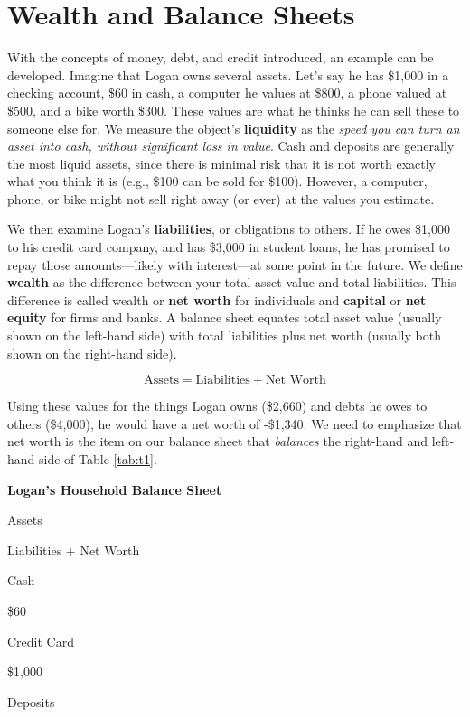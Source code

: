 \documentclass[
]{book}
\begin{document}
\hypertarget{wealth-and-balance-sheets}{%
\section{Wealth and Balance Sheets}\label{wealth-and-balance-sheets}}

With the concepts of money, debt, and credit introduced, an example can be developed. Imagine that Logan owns several assets. Let's say he has \$1,000 in a checking account, \$60 in cash, a computer he values at \$800, a phone valued at \$500, and a bike worth \$300. These values are what he thinks he can sell these to someone else for. We measure the object's \textbf{liquidity} as the \emph{speed you can turn an asset into cash, without significant loss in value}. Cash and deposits are generally the most liquid assets, since there is minimal risk that it is not worth exactly what you think it is (e.g., \$100 can be sold for \$100). However, a computer, phone, or bike might not sell right away (or ever) at the values you estimate.

We then examine Logan's \textbf{liabilities}, or obligations to others. If he owes \$1,000 to his credit card company, and has \$3,000 in student loans, he has promised to repay those amounts---likely with interest---at some point in the future. We define \textbf{wealth} as the difference between your total asset value and total liabilities. This difference is called wealth or \textbf{net worth} for individuals and \textbf{capital} or \textbf{net equity} for firms and banks. A balance sheet equates total asset value (usually shown on the left-hand side) with total liabilities plus net worth (usually both shown on the right-hand side).

\[ \text{Assets}=\text{Liabilities}+\text{Net Worth}\]

Using these values for the things Logan owns (\$2,660) and debts he owes to others (\$4,000), he would have a net worth of -\$1,340. We need to emphasize that net worth is the item on our balance sheet that \emph{balances} the right-hand and left-hand side of Table \ref{tab:t1}.

\label{tab:t1}\textbf{Logan's Household Balance Sheet}

Assets

Liabilities + Net Worth

Cash

\$60

Credit Card

\$1,000

Deposits
\end{document}
